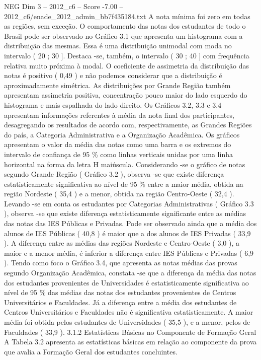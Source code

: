 \begin{textsample}{NEG Dim 3 – 2012\_c6 – Score -7.00 – 2012\_c6/enade\_2012\_admin\_bb7f435184.txt}
A nota mínima foi zero em todas as regiões, sem exceção.
O comportamento das notas dos estudantes de todo o Brasil pode ser observado no Gráfico 3.1 que apresenta um histograma com a distribuição das mesmas.
Essa é uma distribuição unimodal com moda no intervalo ( 20 ; 30 ].
Destaca -se, também, o intervalo ( 30 ; 40 ] com frequência relativa muito próxima à modal.
O coeficiente de assimetria da distribuição das notas é positivo ( 0,49 ) e não podemos considerar que a distribuição é aproximadamente simétrica.
As distribuições por Grande Região também apresentam assimetria positiva, concentração pouco maior do lado esquerdo do histograma e mais espalhada do lado direito.
Os Gráficos 3.2, 3.3 e 3.4 apresentam informações referentes à média da nota final dos participantes, desagregando os resultados de acordo com, respectivamente, as Grandes Regiões do país, a Categoria Administrativa e a Organização Acadêmica.
Os gráficos apresentam o valor da média das notas como uma barra e os extremos do intervalo de confiança de 95 \% como linhas verticais unidas por uma linha horizontal na forma da letra H maiúscula.
Considerando -se o gráfico de notas segundo Grande Região ( Gráfico 3.2 ), observa -se que existe diferença estatisticamente significativa ao nível de 95 \% entre a maior média, obtida na região Nordeste ( 35,4 ) e a menor, obtida na região Centro-Oeste ( 32,4 ).
Levando -se em conta os estudantes por Categorias Administrativas ( Gráfico 3.3 ), observa -se que existe diferença estatisticamente significante entre as médias das notas das IES Públicas e Privadas.
Pode ser observado ainda que a média dos alunos de IES Públicas ( 40,8 ) é maior que a dos alunos de IES Privadas ( 33,9 ).
A diferença entre as médias das regiões Nordeste e Centro-Oeste ( 3,0 ), a maior e a menor média, é inferior a diferença entre IES Públicas e Privadas ( 6,9 ).
Tendo como foco o Gráfico 3.4, que apresenta as notas médias das provas segundo Organização Acadêmica, constata -se que a diferença da média das notas dos estudantes provenientes de Universidades é estatisticamente significativa ao nível de 95 \% das médias das notas dos estudantes provenientes de Centros Universitários e Faculdades.
Já a diferença entre a média dos estudantes de Centros Universitários e Faculdades não é significativa estatisticamente.
A maior média foi obtida pelos estudantes de Universidades ( 35,5 ), e a menor, pelos de Faculdades ( 33,9 ). 3.1.2 Estatísticas Básicas no Componente de Formação Geral A Tabela 3.2 apresenta as estatísticas básicas em relação ao componente da prova que avalia a Formação Geral dos estudantes concluintes.

\end{textsample}
